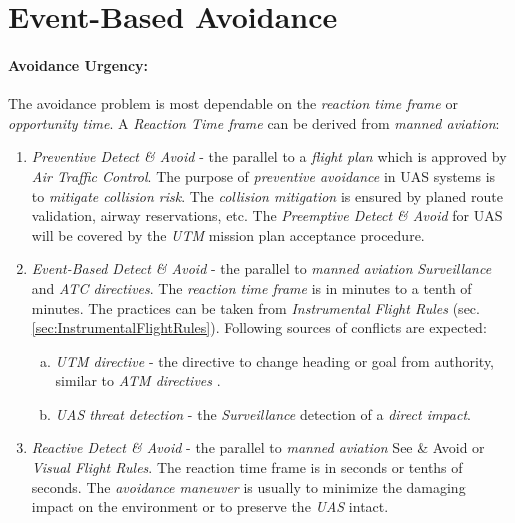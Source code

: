 \newpage
\section{Event-Based Avoidance}\label{sec:EventBasedAvoidance}
\paragraph{Avoidance Urgency:} The avoidance problem is most dependable on the \emph{reaction time frame} or \emph{opportunity time}. A \emph{Reaction Time frame} can be derived from \emph{manned aviation}:

\begin{enumerate}
    \item \emph{Preventive Detect \& Avoid} - the parallel to a \emph{flight plan} which is approved by \emph{Air Traffic Control}. The purpose of \emph{preventive avoidance} in UAS systems is to \emph{mitigate collision risk}. The \emph{collision mitigation} is ensured by planed route validation, airway reservations, etc. The \emph{Preemptive Detect \& Avoid} for UAS will be covered by the \emph{UTM} mission plan acceptance procedure.  
    
    \item \emph{Event-Based Detect \& Avoid} - the parallel to \emph{manned aviation} \emph{Surveillance} and \emph{ATC directives}. The \emph{reaction time frame} is in minutes to a tenth of minutes. The practices can be taken from \emph{Instrumental Flight Rules} (sec. \ref{sec:InstrumentalFlightRules}). Following sources of conflicts are expected:
    \begin{enumerate}[a.]
        \item \emph{UTM directive} - the directive to change heading or goal from authority, similar to \emph{ATM directives} \cite{icao4444}.
        
        \item \emph{UAS threat detection} - the \emph{Surveillance} detection of a \emph{direct impact}.
    \end{enumerate}
    
    \item \emph{Reactive Detect \& Avoid} - the parallel to \emph{manned aviation} See \& Avoid or \emph{Visual Flight Rules}. The reaction time frame is in seconds or tenths of seconds. The \emph{avoidance maneuver} is usually to minimize the damaging impact on the environment or to preserve the \emph{UAS} intact.
\end{enumerate}

